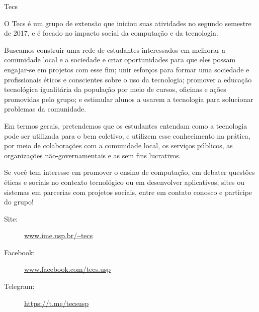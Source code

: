 
\begin{subsecao}{Tecs}


O Tecs é um grupo de extensão que iniciou suas atividades no segundo semestre de
2017, e é focado no impacto social da computação e da tecnologia. 

Buscamos construir uma rede de estudantes interessados em melhorar a comunidade
local e a sociedade e criar oportunidades para que eles possam engajar-se em
projetos com esse fim; unir esforços para formar uma sociedade e profissionais
éticos e conscientes sobre o uso da tecnologia; promover a educação tecnológica
igualitária da população por meio de cursos, oficinas e ações promovidas pelo
grupo; e estimular alunos a usarem a tecnologia para solucionar problemas da
comunidade. 

Em termos gerais, pretendemos que os estudantes entendam como a tecnologia pode
ser utilizada para o bem coletivo, e utilizem esse conhecimento na prática, por
meio de colaborações com a comunidade local, os serviços públicos, as
organizações não-governamentais e as sem fins lucrativos. 

Se você tem interesse em promover o ensino de computação, em debater questões
éticas e sociais no contexto tecnológico ou em desenvolver aplicativos, sites ou
sistemas em parcerias com projetos sociais, entre em contato conosco e participe
do grupo!

\vspace{-1em}
\begin{description}
  \item[Site:] \url{www.ime.usp.br/~tecs}
  \item[Facebook:] \url{www.facebook.com/tecs.usp}
  \item[Telegram:] \url{https://t.me/tecsusp}
\end{description}

\end{subsecao}
